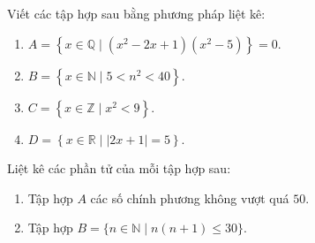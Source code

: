 \begin{vd}%
Viết các tập hợp sau bằng phương pháp liệt kê:
\begin{enumerate}
\item $A=\left\lbrace  x\in \mathbb{Q}\mid (x^2-2x+1)(x^2-5)\right\rbrace=0$.
\item $B=\left\lbrace x \in \mathbb{N}\mid 5<n^2<40\right\rbrace$.
\item $C=\left\lbrace x\in \mathbb{Z}\mid x^2<9\right\rbrace$.
\item $D=\left\lbrace x\in \mathbb{R}\mid \left|2x+1\right|=5\right\rbrace$.
\end{enumerate}
\end{vd}

\begin{vd}
Liệt kê các phần tử của mỗi tập hợp sau:
\begin{enumerate}
\item Tập hợp $A$ các số chính phương không vượt quá $50$.
\item Tập hợp $B=\{n\in \mathbb{N} \mid n(n+1) \leq 30 \}$.
\end{enumerate}
\end{vd}

